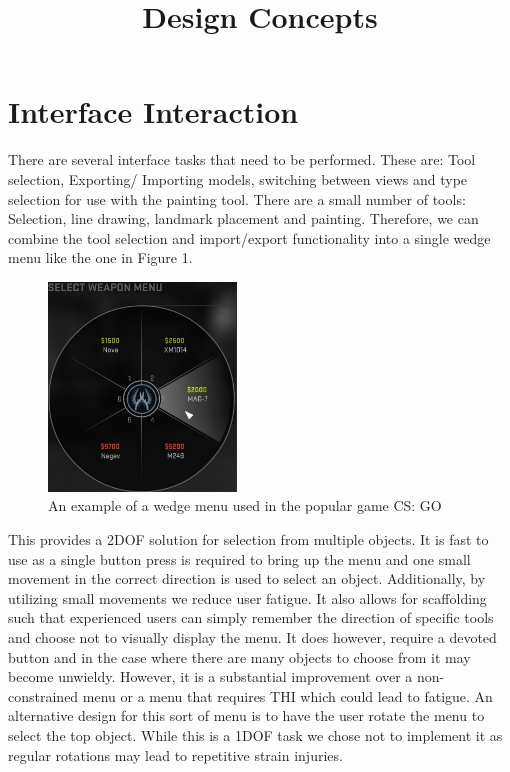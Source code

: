 \documentclass{sig-alternate-05-2015}
\title{Design Concepts}
\begin{document}
\maketitle

\section{Interface Interaction}

There are several interface tasks that need to be performed. These are: Tool selection, Exporting/ Importing models, switching between views and type selection for use with the painting tool.
There are a small number of tools: Selection, line drawing, landmark placement and painting. Therefore, we can combine the tool selection and import/export functionality into a single wedge menu like the one in Figure 1.
\begin{figure}[H]
	\centering
	\includegraphics[width=5cm]{WedgeMenu}
	\caption{An example of a wedge menu used in the popular game CS: GO}
\end{figure}  This provides a 2DOF solution for selection from multiple objects. It is fast to use as a single button press is required to bring up the menu and one small movement in the correct direction is used to select an object\cite{Kurtenbach1993}. Additionally, by utilizing small movements we reduce user fatigue. It also allows for scaffolding such that experienced users can simply remember the direction of specific tools and choose not to visually display the menu\cite{Conner1992}. It does however, require a devoted button and in the case where there are many objects to choose from it may become unwieldy. However, it is a substantial improvement over a non-constrained menu or a menu that requires THI which could lead to fatigue. An alternative design for this sort of menu is to have the user rotate the menu to select the top object\cite{Hand1997}. While this is a 1DOF task we chose not to implement it as regular rotations may lead to repetitive strain injuries.
\end{document}
